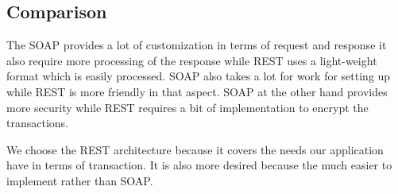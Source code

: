 \subsection{Comparison}
The SOAP provides a lot of customization in terms of request and response it also require more processing of the response while REST uses a light-weight format which is easily processed. SOAP also takes a lot for work for setting up while REST is more friendly in that aspect. SOAP at the other hand provides more security while REST requires a bit of implementation to encrypt the transactions.

We choose the REST architecture because it covers the needs our application have in terms of transaction. It is also more desired because the much easier to implement rather than SOAP.